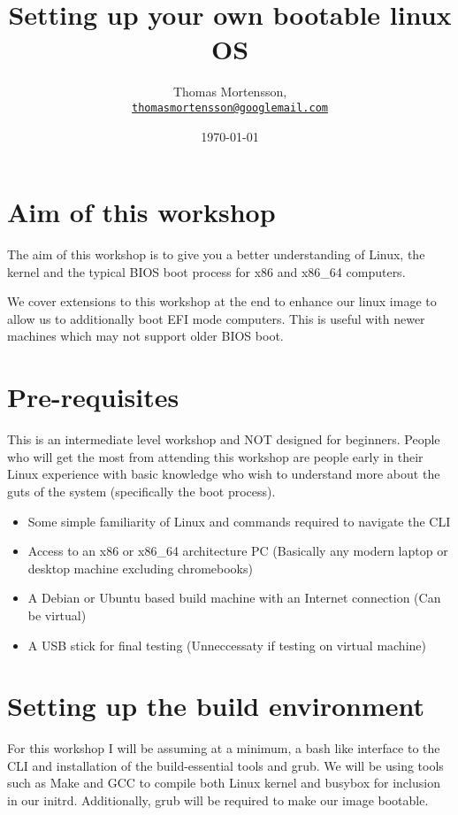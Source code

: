 \documentclass[twocolumn]{article}
\begin{document}
\lstset{style=Style1}

\title{Setting up your own bootable linux OS} 
\author{Thomas Mortensson,\\
		\texttt{\href{mailto:thomasmortensson@googlemail.com}{thomasmortensson@googlemail.com}} 
		}
\date{\today} 
\maketitle

\section{Aim of this workshop}
The aim of this workshop is to give you a better understanding of Linux, the kernel and the typical BIOS boot process for x86 and x86\_64 computers.

We cover extensions to this workshop at the end to enhance our linux image to allow us to additionally boot EFI mode computers. This is useful with newer machines which may not support older BIOS boot.

\section{Pre-requisites}

This is an intermediate level workshop and NOT designed for beginners. People who will get the most from attending this workshop are people early in their Linux experience with basic knowledge who wish to understand more about the guts of the system (specifically the boot process).
\begin{itemize}
	\item Some simple familiarity of Linux and commands required to navigate the CLI
	\item Access to an x86 or x86\_64 architecture PC (Basically any modern laptop or desktop machine excluding chromebooks)
	\item A Debian or Ubuntu based build machine with an Internet connection (Can be virtual)
	\item A USB stick for final testing (Unneccessaty if testing on virtual machine)
\end{itemize}

\section{Setting up the build environment}

For this workshop I will be assuming at a minimum, a bash like interface to the CLI and installation of the build-essential tools and grub. We will be using tools such as Make and GCC to compile both Linux kernel and busybox for inclusion in our initrd. Additionally, grub will be required to make our image bootable.
\end{document}

